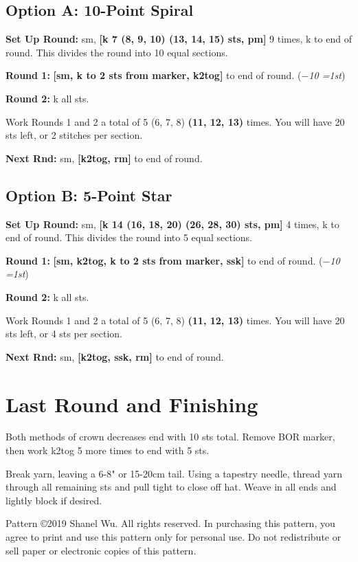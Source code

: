 \documentclass[12pt]{article}
\newcommand{\rowDir}[1]{\textbf{#1:}} %
\renewcommand{\repeat}[1]{\textbf{[#1]}} %
\newcommand{\decrease}[1]{(\emph{$-$#1
	\ifnum#1=1{st}\else{sts}\fi})}
\newenvironment{frnote}
    {%
    	\setlength{\FrameRule}{1.5pt}
    	\def\FrameCommand{\fboxrule=\FrameRule\fboxsep=\FrameSep \fcolorbox{framecolor}{shadecolor}}
    	\MakeFramed {\FrameRestore}}
    {\setlength{\FrameRule}{1pt}
	\endMakeFramed}
\begin{document}
\begin{multicols}{2}
\subsection*{Option A: 10-Point Spiral}

\rowDir{Set Up Round} sm, \repeat{k 7 (8, 9, 10) (13, 14, 15) sts, pm} 9 times, k to end of round. This divides the round into 10 equal sections.

\rowDir{Round 1} \repeat{sm, k to 2 sts from marker, k2tog} to end of round. \decrease{10}

\rowDir{Round 2} k all sts.

Work Rounds 1 and 2 a total of 5 (6, 7, 8) \textbf{(11, 12, 13)} times. You will have 20 sts left, or 2 stitches per section.

\rowDir{Next Rnd} sm, \repeat{k2tog, rm} to end of round.

\subsection*{Option B: 5-Point Star}

\rowDir{Set Up Round} sm, \repeat{k 14 (16, 18, 20) (26, 28, 30) sts, pm} 4 times, k to end of round. This divides the round into 5 equal sections.

\rowDir{Round 1} \repeat{sm, k2tog, k to 2 sts from marker, ssk} to end of round. \decrease{10}

\rowDir{Round 2} k all sts.

Work Rounds 1 and 2 a total of 5 (6, 7, 8) \textbf{(11, 12, 13)} times. You will have 20 sts left, or 4 sts per section.

\rowDir{Next Rnd} sm, \repeat{k2tog, ssk, rm} to end of round. 

\section*{Last Round and Finishing}

Both methods of crown decreases end with 10 sts total. Remove BOR marker, then work k2tog 5 more times to end with 5 sts. 

Break yarn, leaving a 6-8" or 15-20cm tail. Using a tapestry needle, thread yarn through all remaining sts and pull tight to close off hat. Weave in all ends and lightly block if desired.

\vfill
\begin{frnote}
\ssmall Pattern \copyright 2019 Shanel Wu. All rights reserved. In purchasing this pattern, you agree to print and use this pattern only for personal use. Do not redistribute or sell paper or electronic copies of this pattern.
\end{frnote}
\columnbreak

\end{multicols}
\end{document}
